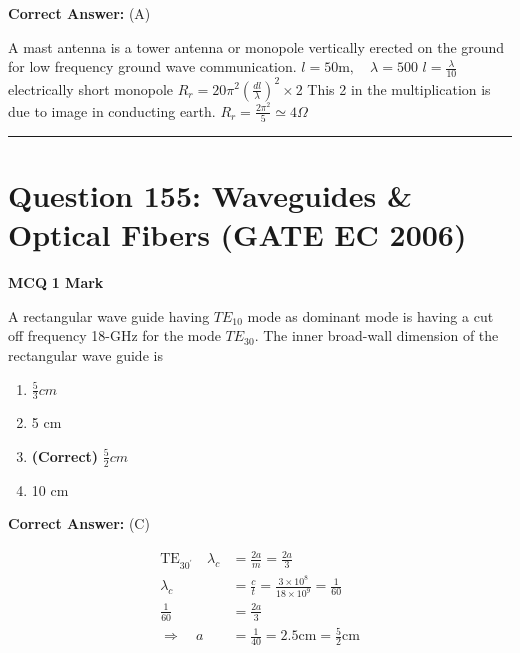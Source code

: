 \documentclass[11pt,a4paper]{article}
\begin{document}
\noindent \textbf{Correct Answer:} (A)

\begin{tcolorbox}[solbox, title=Detailed Solution -- Question 154]
A mast antenna is a tower antenna or monopole  vertically erected on the ground for low frequency  ground wave communication.
$l=50 \mathrm{m}, \quad \lambda=500$
$l=\frac{\lambda}{10}$electrically short monopole
$R_{r}=20 \pi^{2}\left(\frac{d l}{\lambda}\right)^{2} \times 2$
 This 2 in the multiplication is due to image in conducting earth.
$R_{r}=\frac{2 \pi^{2}}{5} \simeq 4 \Omega$
\end{tcolorbox}

\vspace{1.5em}
\hrule
\vspace{1.5em}

\section*{Question 155: Waveguides \& Optical Fibers (GATE EC 2006)}
\noindent \textbf{\color{primary}MCQ} \hfill \textbf{\color{secondary}1 Mark}


\noindent A rectangular wave guide having $TE_{10}$ mode as dominant mode is having a cut off frequency 18-GHz for the mode $TE_{30}$. The inner broad-wall dimension of the rectangular wave guide is


\begin{enumerate}[label=(\Alph*)]
    \item $\frac{5}{3}cm$
    \item 5 cm
    \item \textbf{(Correct)} $\frac{5}{2}cm$
    \item 10 cm
\end{enumerate}

\noindent \textbf{Correct Answer:} (C)

\begin{tcolorbox}[solbox, title=Detailed Solution -- Question 155]
\[
\begin{aligned} \mathrm{TE}_{30^{\prime}} \quad \lambda_{c}&=\frac{2 a}{m}=\frac{2 a}{3} \\ \lambda_{c} &=\frac{c}{t}=\frac{3 \times 10^{8}}{18 \times 10^{9}}=\frac{1}{60} \\ \frac{1}{60} &=\frac{2 a}{3} \\ \Rightarrow \quad a &=\frac{1}{40}=2.5 \mathrm{cm}=\frac{5}{2} \mathrm{cm} \end{aligned}
\]
\end{tcolorbox}
\end{document}
